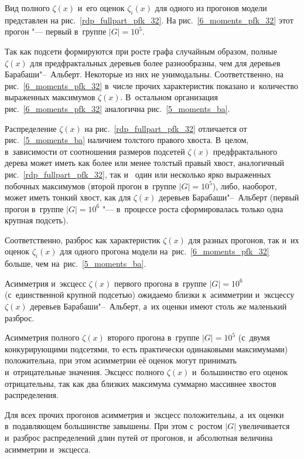 \documentclass[10pt, a5paper]{article}
\begin{document}
Вид полного $\zeta(x)$ и~его оценок $\zeta_i(x)$ для одного из прогонов модели представлен на рис.~\ref{rdp_fullpart_pfk_32}.
На рис.~\ref{6_moments_pfk_32} этот прогон "--- первый в~группе $|G|=10^5$.

Так как подсети формируются при росте графа случайным образом,
полные $\zeta(x)$ для предфрактальных деревьев более разнообразны, чем для деревьев Барабаши"--~Альберт.
Некоторые из них не унимодальны.
Соответственно, на рис.~\ref{6_moments_pfk_32}
в~числе прочих характеристик показано и~количество выраженных максимумов $\zeta(x)$.
В~остальном организация рис.~\ref{6_moments_pfk_32} аналогична рис.~\ref{5_moments_ba}.

Распределение $\zeta(x)$ на рис.~\ref{rdp_fullpart_pfk_32} отличается от рис.~\ref{5_moments_ba} наличием толстого правого хвоста.
В~целом, в~зависимости от соотношения размеров подсетей 
$\zeta(x)$ предфрактального дерева может иметь как более или менее толстый правый хвост, аналогичный рис.~\ref{rdp_fullpart_pfk_32}, так и~
один или несколько ярко выраженных побочных максимумов (второй прогон в~группе $|G|=10^5$), либо, наоборот, может иметь тонкий хвост, как для $\zeta(x)$  деревьев Барабаши"--~Альберт (первый прогон в~группе $|G|=10^6$ "--- в~процессе роста сформировалась только одна крупная подсеть).

Соответственно, разброс как характеристик $\zeta(x)$ для разных прогонов, так и~их оценок $\zeta_i(x)$ для одного прогона модели на~рис.~\ref{6_moments_pfk_32} больше, чем на~рис.~\ref{5_moments_ba}.

Асимметрия и~эксцесс $\zeta(x)$ первого прогона в~группе $|G|=10^6$ (с~единственной крупной подсетью) ожидаемо близки к~асимметрии и~эксцессу $\zeta(x)$  деревьев Барабаши"--~Альберт, а~их оценки имеют столь же маленький разброс.

Асимметрия полного $\zeta(x)$ второго прогона в~группе $|G|=10^5$ (с~двумя конкурирующими подсетями, то есть практически одинаковыми максимумами) положительна, 
при этом асимметрии её оценок могут принимать и~отрицательные значения.
Эксцесс полного $\zeta(x)$ и~большинство его оценок отрицательны, так как два близких максимума суммарно массивнее хвостов распределения.

Для всех прочих прогонов асимметрия и~эксцесс положительны, а~их оценки в~подавляющем большинстве завышены.
При этом с~ростом $|G|$ увеличивается и~разброс распределений длин путей от прогонов, и~абсолютная величина асимметрии и~эксцесса.
\end{document}
